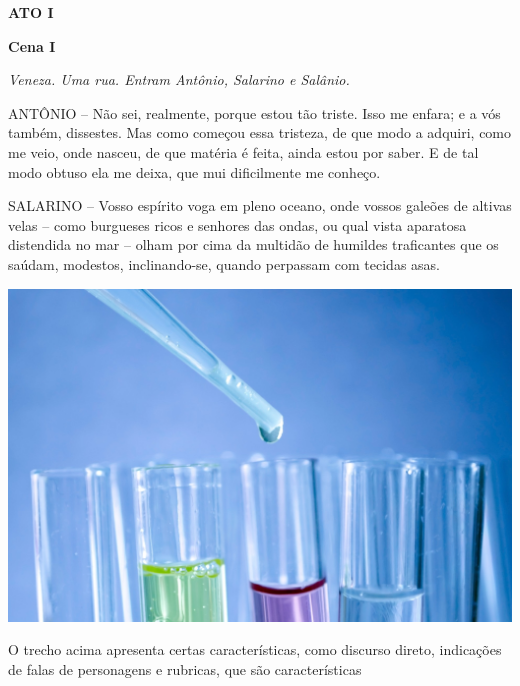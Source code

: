 \begin{myquote}

\textbf{ATO I}

\textbf{Cena I}

\begin{minipage}{0.7\textwidth}
\textit{Veneza. Uma rua. Entram Antônio, Salarino e Salânio.}

ANTÔNIO -- Não sei, realmente, porque estou tão triste. Isso me enfara; e
a vós também, dissestes. Mas como começou essa tristeza, de que modo a
adquiri, como me veio, onde nasceu, de que matéria é feita, ainda estou
por saber. E de tal modo obtuso ela me deixa, que mui dificilmente me
conheço.

SALARINO -- Vosso espírito voga em pleno oceano, onde vossos galeões de
altivas velas -- como burgueses ricos e senhores das ondas, ou qual vista
aparatosa distendida no mar -- olham por cima da multidão de humildes
traficantes que os saúdam, modestos, inclinando-se, quando perpassam com
tecidas asas.
\end{minipage}
\hfill
\begin{minipage}{0.2\textwidth}
  \centering
  \includegraphics[width=\textwidth]{./imgSAEB_7_POR/media/image61.png}
\end{minipage}


\end{myquote}

O trecho acima apresenta certas características, como discurso direto,
indicações de falas de personagens e rubricas, que são características 

